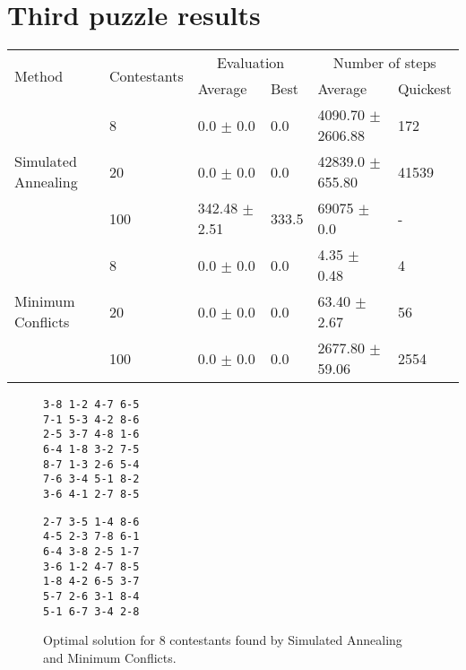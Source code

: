 \section{Third puzzle results}


\begin{table*}\centering
    \caption{}
    \label{tab:roundrobin}
	\vspace{2mm}
	\begin{tabular}{llllll}
		\toprule[2.0px]
			\multirow{2}{*}{Method} & 
			\multirow{2}{*}{Contestants} & 
			\multicolumn{2}{c}{Evaluation} 	& 
			\multicolumn{2}{c}{Number of steps}\\
			   &          & Average & Best & Average & Quickest \\ 
		\midrule
		\multirow{3}{*}{Simulated Annealing} 
			& 8  & 0.0 $\pm$ 0.0 & 0.0 &  4090.70 $\pm$ 2606.88 & 172\\ %
			& 20 & 0.0 $\pm$ 0.0 & 0.0 &  42839.0 $\pm$ 655.80  & 41539 \\ %
			& 100& 342.48 $\pm$ 2.51 & 333.5 & 69075 $\pm$ 0.0 & - \\ %
		\midrule
		\multirow{3}{*}{Minimum Conflicts}
			& 8  & 0.0 $\pm$ 0.0 & 0.0 & 4.35 $\pm$ 0.48 & 4\\ %
			& 20 & 0.0 $\pm$ 0.0 & 0.0 & 63.40 $\pm$ 2.67 & 56\\ %
			& 100 & 0.0 $\pm$ 0.0 & 0.0 & 2677.80 $\pm$ 59.06& 2554 \\ %
		\bottomrule[2.0px]
	\end{tabular}
\end{table*}

\begin{figure}[h]
	\centering
	\caption{Optimal solution for 8 contestants found by Simulated Annealing and Minimum Conflicts.}
	\label{kqueens_demo}
\begin{minipage}{0.4\textwidth}
		\begin{verbatim}
3-8 1-2 4-7 6-5 
7-1 5-3 4-2 8-6 
2-5 3-7 4-8 1-6 
6-4 1-8 3-2 7-5 
8-7 1-3 2-6 5-4 
7-6 3-4 5-1 8-2 
3-6 4-1 2-7 8-5 
		\end{verbatim}
\end{minipage}
\begin{minipage}{0.4\textwidth}
		\begin{verbatim}
2-7 3-5 1-4 8-6 
4-5 2-3 7-8 6-1 
6-4 3-8 2-5 1-7 
3-6 1-2 4-7 8-5 
1-8 4-2 6-5 3-7 
5-7 2-6 3-1 8-4 
5-1 6-7 3-4 2-8
		\end{verbatim}
\end{minipage}
\end{figure}